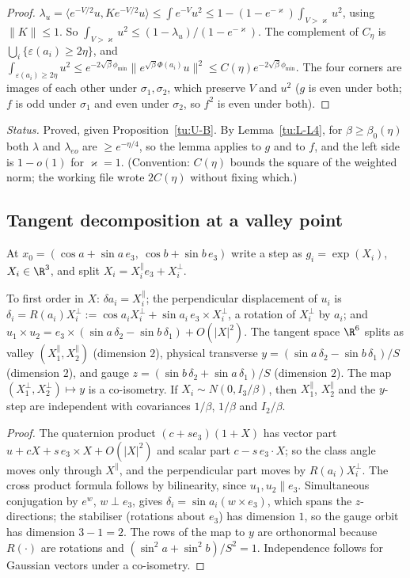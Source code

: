 \begin{proof}
$\lambda_u=\langle e^{-V/2}u,Ke^{-V/2}u\rangle\le\int e^{-V}u^2\le1-(1-e^{-\varkappa})\int_{V>\varkappa}u^2$,
using $\|K\|\le1$. So $\int_{V>\varkappa}u^2\le(1-\lambda_u)/(1-e^{-\varkappa})$. The complement of
$C_\eta$ is $\bigcup_i\{\varepsilon(a_i)\ge2\eta\}$, and
$\int_{\varepsilon(a_i)\ge2\eta}u^2\le e^{-2\sqrt\beta\phi_{\min}}\|e^{\sqrt\beta\Phi(a_i)}u\|^2\le C(\eta)e^{-2\sqrt\beta\phi_{\min}}$.
The four corners are images of each other under $\sigma_1,\sigma_2$, which preserve $V$ and $u^2$
($g$ is even under both; $f$ is odd under $\sigma_1$ and even under $\sigma_2$, so $f^2$ is even under both).
\end{proof}

\noindent\emph{Status.} Proved, given Proposition~\ref{tu:U-B}. By Lemma~\ref{tu:L-L4}, for
$\beta\ge\beta_0(\eta)$ both $\lambda$ and $\lambda_{eo}$ are $\ge e^{-\eta/4}$, so the lemma applies
to $g$ and to $f$, and the left side is $1-o(1)$ for $\varkappa=1$. (Convention: $C(\eta)$ bounds the
square of the weighted norm; the working file wrote $2C(\eta)$ without fixing which.)

\subsection{Tangent decomposition at a valley point}

At $x_0=(\cos a+\sin a\,e_3,\ \cos b+\sin b\,e_3)$ write a step as $g_i=\exp(X_i)$, $X_i\in\R^3$, and
split $X_i=X_i^\parallel e_3+X_i^\perp$.

\begin{lemma}\label{tu:L-tangent}
To first order in $X$: $\delta a_i=X_i^\parallel$; the perpendicular displacement of $u_i$ is
$\delta_i=R(a_i)X_i^\perp:=\cos a_iX_i^\perp+\sin a_i\,e_3\times X_i^\perp$, a rotation of $X_i^\perp$
by $a_i$; and $u_1\times u_2=e_3\times(\sin a\,\delta_2-\sin b\,\delta_1)+O(|X|^2)$. The tangent space
$\R^6$ splits as valley $(X_1^\parallel,X_2^\parallel)$ (dimension $2$), physical transverse
$y=(\sin a\,\delta_2-\sin b\,\delta_1)/S$ (dimension $2$), and gauge
$z=(\sin b\,\delta_2+\sin a\,\delta_1)/S$ (dimension $2$). The map $(X_1^\perp,X_2^\perp)\mapsto y$
is a co-isometry. If $X_i\sim N(0,I_3/\beta)$, then $X_1^\parallel$, $X_2^\parallel$ and the $y$-step are
independent with covariances $1/\beta$, $1/\beta$ and $I_2/\beta$.
\end{lemma}

\begin{proof}
The quaternion product $(c+s e_3)(1+X)$ has vector part $u+cX+s\,e_3\times X+O(|X|^2)$ and scalar part
$c-s\,e_3\cdot X$; so the class angle moves only through $X^\parallel$, and the perpendicular part moves
by $R(a_i)X_i^\perp$. The cross product formula follows by bilinearity, since $u_1,u_2\parallel e_3$.
Simultaneous conjugation by $e^{w}$, $w\perp e_3$, gives $\delta_i=\sin a_i(w\times e_3)$, which spans
the $z$-directions; the stabiliser (rotations about $e_3$) has dimension $1$, so the gauge orbit has
dimension $3-1=2$. The rows of the map to $y$ are orthonormal because $R(\cdot)$ are rotations and
$(\sin^2a+\sin^2b)/S^2=1$. Independence follows for Gaussian vectors under a co-isometry.
\end{proof}

